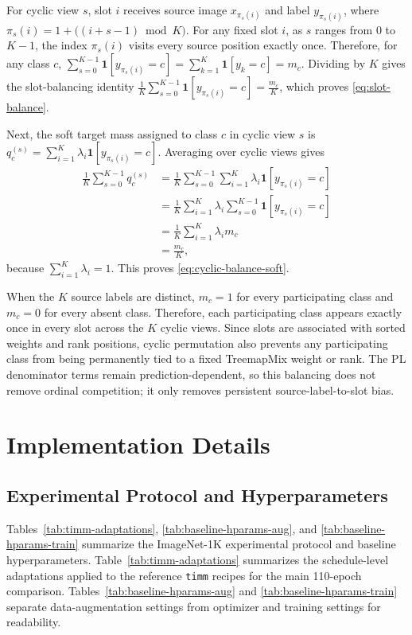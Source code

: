 For cyclic view $s$, slot $i$ receives source image $x_{\pi_s(i)}$ and label $y_{\pi_s(i)}$, where \(\pi_s(i)=1+\bigl((i+s-1)\bmod K\bigr)\).
For any fixed slot $i$, as $s$ ranges from $0$ to $K-1$, the index $\pi_s(i)$ visits every source position exactly once. Therefore, for any class $c$,
\(\sum_{s=0}^{K-1}\mathbf{1}[y_{\pi_s(i)}=c]=\sum_{k=1}^{K}\mathbf{1}[y_k=c]=m_c\). Dividing by $K$ gives the slot-balancing identity \(\frac{1}{K}\sum_{s=0}^{K-1}\mathbf{1}[y_{\pi_s(i)}=c]=\frac{m_c}{K}\),
which proves \eqref{eq:slot-balance}.

Next, the soft target mass assigned to class $c$ in cyclic view $s$ is \(q_c^{(s)}=\sum_{i=1}^{K}\lambda_i\mathbf{1}[y_{\pi_s(i)}=c]\).
Averaging over cyclic views gives
\[
\begin{aligned}
\frac{1}{K}
\sum_{s=0}^{K-1}
q_c^{(s)}
&=
\frac{1}{K}
\sum_{s=0}^{K-1}
\sum_{i=1}^{K}
\lambda_i\mathbf{1}[y_{\pi_s(i)}=c] \\
&=
\frac{1}{K}
\sum_{i=1}^{K}
\lambda_i
\sum_{s=0}^{K-1}
\mathbf{1}[y_{\pi_s(i)}=c] \\
&=
\frac{1}{K}
\sum_{i=1}^{K}
\lambda_i m_c \\
&=
\frac{m_c}{K},
\end{aligned}
\]
because $\sum_{i=1}^{K}\lambda_i=1$. This proves \eqref{eq:cyclic-balance-soft}.

When the $K$ source labels are distinct, $m_c=1$ for every participating class and $m_c=0$ for every absent class. Therefore, each participating class appears exactly once in every slot across the $K$ cyclic views. Since slots are associated with sorted weights and rank positions, cyclic permutation also prevents any participating class from being permanently tied to a fixed TreemapMix weight or rank. The PL denominator terms remain prediction-dependent, so this balancing does not remove ordinal competition; it only removes persistent source-label-to-slot bias.

\section{Implementation Details}
\subsection{Experimental Protocol and Hyperparameters}
\label{app:appendix-aug-configs}

Tables~\ref{tab:timm-adaptations}, \ref{tab:baseline-hparams-aug}, and
\ref{tab:baseline-hparams-train} summarize the ImageNet-1K experimental
protocol and baseline hyperparameters. Table~\ref{tab:timm-adaptations}
summarizes the schedule-level adaptations applied to the reference
\texttt{timm} recipes for the main 110-epoch comparison.
Tables~\ref{tab:baseline-hparams-aug} and
\ref{tab:baseline-hparams-train} separate data-augmentation settings from
optimizer and training settings for readability.

